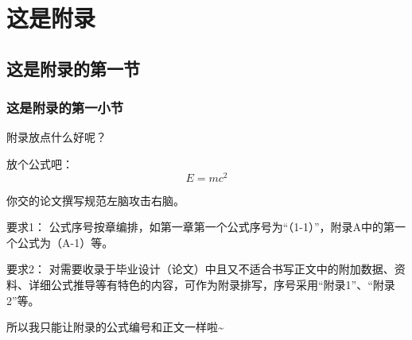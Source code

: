 \chapter{这是附录}

\section{这是附录的第一节}

\subsection{这是附录的第一小节}

附录放点什么好呢？

放个公式吧：
\begin{equation}
    E = mc^2
\end{equation}

你交的论文撰写规范左脑攻击右脑。

要求1：
公式序号按章编排，如第一章第一个公式序号为“（1-1）”，附录A中的第一个公式为（A-1）等。

要求2：
对需要收录于毕业设计（论文）中且又不适合书写正文中的附加数据、资料、详细公式推导等有特色的内容，可作为附录排写，序号采用“附录1”、“附录2”等。

所以我只能让附录的公式编号和正文一样啦\~{}
